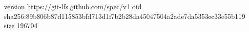 version https://git-lfs.github.com/spec/v1
oid sha256:89b806b87d115853bfd713d1f7b2b28da45047504a2ade7da5353ec33e55b119
size 196704
